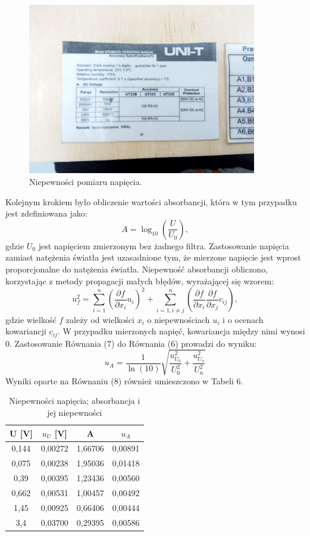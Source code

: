 \documentclass[10pt,a4paper]{article}
\begin{document}
\begin{figure}[h!]
\includegraphics[width=10cm]{rap7} 
\centering
\caption{Niepewności pomiaru napięcia.}
\end{figure}

 Kolejnym krokiem było obliczenie wartości absorbancji, która w tym przypadku jest zdefiniowana jako:
\begin{equation}
A=\log_{10}\left(\dfrac{U}{U_{0}}\right),
\end{equation}
gdzie $U_{0}$ jest napięciem zmierzonym bez żadnego filtra. Zastosowanie napięcia zamiast natężenia światła jest uzasadnione tym, że mierzone napięcie jest wprost proporcjonalne do natężenia światła. Niepewność absorbancji obliczono, korzystając z metody propagacji małych błędów, wyrażającej się wzorem:
 \begin{equation}
 u_{f}^2=\sum_{i=1}^n \left( \dfrac{\partial f}{\partial x_{i}}u_{i}\right)^2+\sum_{i=1, i\neq j}^n \left( \dfrac{\partial f}{\partial x_{i}}\dfrac{\partial f}{\partial x_{j}}c_{ij}\right),
 \end{equation}
 gdzie wielkość $f$ zależy od wielkości $x_{i}$ o niepewnościach $u_{i}$ i o ocenach kowariancji $c_{ij}$. W przypadku mierzonych napięć, kowariancja między nimi wynosi 0. Zastosowanie Równania (7) do Równania (6) prowadzi do wyniku:
 \begin{equation}
 u_{A}=\dfrac{1}{\ln(10)}\sqrt{\dfrac{u_{U_{0}}^2}{U_{0}^2}+\dfrac{u_{U_{n}}^2}{U_{n}^2}}
\end{equation}
Wyniki oparte na Równaniu (8) również umieszczono w Tabeli 6.

\begin{table}[h!]
\centering
\caption{Niepewności napięcia; absorbancja i jej niepewności}
\label{t6}
\begin{tabular}{|c|c|c|c|}
\hline
U [V] & $u_{U}$ [V] & A       & $u_{A}$ \\ \hline
0,144 & 0,00272     & 1,66706 & 0,00891 \\ \hline
0,075 & 0,00238     & 1,95036 & 0,01418 \\ \hline
0,39  & 0,00395     & 1,23436 & 0,00560 \\ \hline
0,662 & 0,00531     & 1,00457 & 0,00492 \\ \hline
1,45  & 0,00925     & 0,66406 & 0,00444 \\ \hline
3,4   & 0,03700     & 0,29395 & 0,00586 \\ \hline
\end{tabular}
\end{table}
\end{document}
